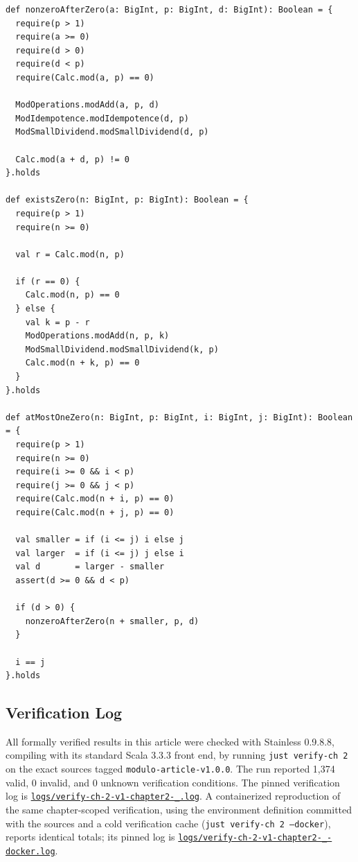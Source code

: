 \begin{lstlisting}[style=scala]
def nonzeroAfterZero(a: BigInt, p: BigInt, d: BigInt): Boolean = {
  require(p > 1)
  require(a >= 0)
  require(d > 0)
  require(d < p)
  require(Calc.mod(a, p) == 0)

  ModOperations.modAdd(a, p, d)
  ModIdempotence.modIdempotence(d, p)
  ModSmallDividend.modSmallDividend(d, p)

  Calc.mod(a + d, p) != 0
}.holds

def existsZero(n: BigInt, p: BigInt): Boolean = {
  require(p > 1)
  require(n >= 0)

  val r = Calc.mod(n, p)

  if (r == 0) {
    Calc.mod(n, p) == 0
  } else {
    val k = p - r
    ModOperations.modAdd(n, p, k)
    ModSmallDividend.modSmallDividend(k, p)
    Calc.mod(n + k, p) == 0
  }
}.holds

def atMostOneZero(n: BigInt, p: BigInt, i: BigInt, j: BigInt): Boolean = {
  require(p > 1)
  require(n >= 0)
  require(i >= 0 && i < p)
  require(j >= 0 && j < p)
  require(Calc.mod(n + i, p) == 0)
  require(Calc.mod(n + j, p) == 0)

  val smaller = if (i <= j) i else j
  val larger  = if (i <= j) j else i
  val d       = larger - smaller
  assert(d >= 0 && d < p)

  if (d > 0) {
    nonzeroAfterZero(n + smaller, p, d)
  }

  i == j
}.holds
\end{lstlisting}

\subsection{Verification Log}
\label{sec:appendix-verification-log}

All formally verified results in this article were checked with Stainless
0.9.8.8, compiling with its standard Scala 3.3.3 front end, by running
\texttt{just verify-ch 2} on the exact sources tagged
\texttt{modulo-article-v1.0.0}. The run reported 1,374 valid, 0 invalid,
and 0 unknown verification conditions. The pinned verification log is
\href{https://github.com/thiagomata/prime-numbers/blob/modulo-article-v1.0.0/logs/verify-ch-2-v1-chapter2-_.log}{\texttt{logs/verify-ch-2-v1-chapter2-\_.log}}.
A containerized reproduction of the same chapter-scoped verification, using
the environment definition committed with the sources and a cold
verification cache (\texttt{just verify-ch 2 --docker}), reports identical
totals; its pinned log is
\href{https://github.com/thiagomata/prime-numbers/blob/modulo-article-v1.0.0/logs/verify-ch-2-v1-chapter2-_-docker.log}{\texttt{logs/verify-ch-2-v1-chapter2-\_-docker.log}}.
